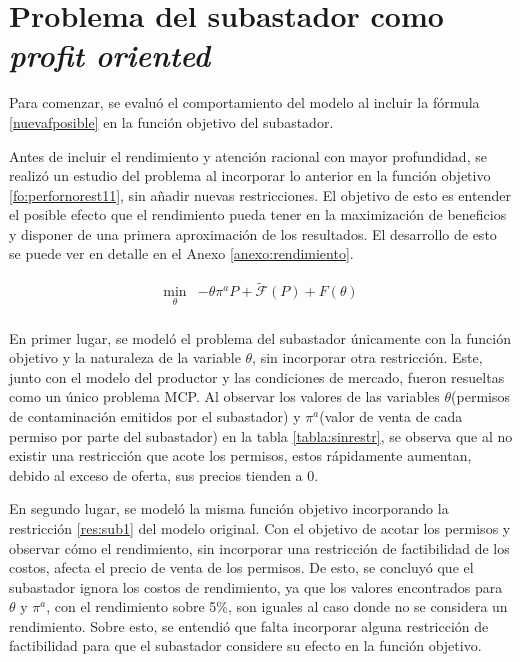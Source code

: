 \section{Problema del subastador como \textit{profit oriented}}\label{profit}



Para comenzar, se evaluó el comportamiento del modelo al incluir la fórmula \ref{nuevafposible} en la función objetivo del subastador.
\vspace{2.5mm}

Antes de incluir el rendimiento y atención racional con mayor profundidad, se realizó un estudio del problema al incorporar lo anterior en la función objetivo \ref{fo:perfornorest11}, sin añadir nuevas restricciones. El objetivo de esto es entender el posible efecto que el rendimiento pueda tener en la maximización de beneficios y disponer de una primera aproximación de los resultados. El desarrollo de esto se puede ver en detalle en el Anexo \ref{anexo:rendimiento}. \vspace{2.5mm}

\begin{equation}
\begin{array}{rrclcl}
    \displaystyle \min_{\theta} & -\theta \pi^aP + \tilde{\mathcal{F}}(P)+F(\theta)  \label{fo:perfornorest11}\\
\end{array}
\end{equation}

En primer lugar, se modeló el problema del subastador únicamente con la función objetivo y la naturaleza de la variable $\theta$, sin incorporar otra restricción. Este, junto con el modelo del productor y las condiciones de mercado, fueron resueltas como un único problema MCP. Al observar los valores de las variables $\theta$(permisos de contaminación emitidos por el subastador) y $\pi^a$(valor de venta de cada permiso por parte del subastador) en la tabla \ref{tabla:sinrestr}, se observa que al no existir una restricción que acote los permisos, estos rápidamente aumentan, debido al exceso de oferta, sus precios tienden a 0.
\vspace{2.5mm}

En segundo lugar, se modeló la misma función objetivo incorporando la restricción \ref{res:sub1} del modelo original. Con el objetivo de acotar los permisos y observar cómo el rendimiento, sin incorporar una restricción de factibilidad de los costos, afecta el precio de venta de los permisos. De esto, se concluyó que el subastador ignora los costos de rendimiento, ya que los valores encontrados para $\theta$ y  $\pi^a$, con el rendimiento sobre 5\%, son iguales al caso donde no se considera un rendimiento. Sobre esto, se entendió que falta incorporar alguna restricción de factibilidad para que el subastador considere su efecto en la función objetivo.
\vspace{2.5mm}

